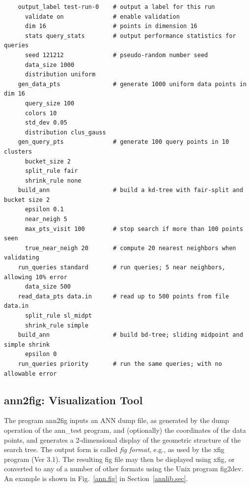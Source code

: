 \documentclass[11pt]{article}		%
\newcommand{\ANN}[0]{\textsf{ANN}}
\newcommand{\anntest}[0]{\textsf{ann\_test}}
\newcommand{\annfig}[0]{\textsf{ann2fig}}
\begin{document}
{\small \begin{verbatim}
    output_label test-run-0    # output a label for this run
      validate on              # enable validation
      dim 16                   # points in dimension 16
      stats query_stats        # output performance statistics for queries
      seed 121212              # pseudo-random number seed
      data_size 1000
      distribution uniform
    gen_data_pts               # generate 1000 uniform data points in dim 16
      query_size 100
      colors 10
      std_dev 0.05
      distribution clus_gauss
    gen_query_pts              # generate 100 query points in 10 clusters
      bucket_size 2
      split_rule fair
      shrink_rule none
    build_ann                  # build a kd-tree with fair-split and bucket size 2
      epsilon 0.1
      near_neigh 5
      max_pts_visit 100        # stop search if more than 100 points seen
      true_near_neigh 20       # compute 20 nearest neighbors when validating
    run_queries standard       # run queries; 5 near neighbors, allowing 10% error
      data_size 500
    read_data_pts data.in      # read up to 500 points from file data.in
      split_rule sl_midpt
      shrink_rule simple
    build_ann                  # build bd-tree; sliding midpoint and simple shrink
      epsilon 0
    run_queries priority       # run the same queries; with no allowable error
\end{verbatim} }

\subsection{\annfig: Visualization Tool}\label{ann2fig.sec}

The program {\annfig} inputs an {\ANN} dump file, as generated by the
\textsf{dump} operation of the {\anntest} program, and (optionally) the
coordinates of the data points, and generates a 2-dimensional display
of the geometric structure of the search tree.  The output form is called
\emph{fig format}, e.g., as used by the \textsf{xfig} program (Ver 3.1).  The
resulting fig file may then be displayed using xfig, or converted to any
of a number of other formats using the Unix program \textsf{fig2dev}.  An
example is shown in Fig.~\ref{ann.fig} in Section~\ref{annlib.sec}.
\end{document}
